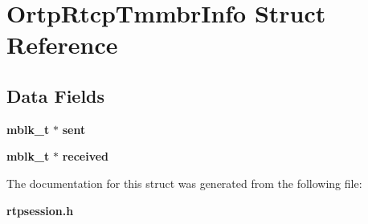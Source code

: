 \section{Ortp\+Rtcp\+Tmmbr\+Info Struct Reference}
\label{structOrtpRtcpTmmbrInfo}
\subsection*{Data Fields}
\begin{DoxyCompactItemize}
\item 
\mbox{\label{structOrtpRtcpTmmbrInfo_a459cd4ae53bdd1e6649a8bcdea26d67e}} 
\textbf{ mblk\+\_\+t} $\ast$ {\bfseries sent}
\item 
\mbox{\label{structOrtpRtcpTmmbrInfo_ab3b60ce08cf04e4413a446a7ce2ba0ec}} 
\textbf{ mblk\+\_\+t} $\ast$ {\bfseries received}
\end{DoxyCompactItemize}


The documentation for this struct was generated from the following file\+:\begin{DoxyCompactItemize}
\item 
\textbf{ rtpsession.\+h}\end{DoxyCompactItemize}
